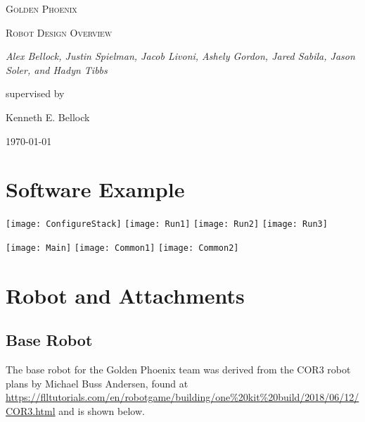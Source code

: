 \documentclass[letter, article]{article}
\begin{document}
\begin{titlepage}
	\centering
	{\scshape\LARGE Golden Phoenix \par}
	\vspace{1cm}
	{\scshape\Large Robot Design Overview\par}
	\vspace{1.5cm}
	{\huge\bfseries \par}
	\vspace{2cm}
	{\Large\itshape Alex Bellock, Justin Spielman, Jacob Livoni, Ashely Gordon, Jared Sabila, Jason Soler, and Hadyn Tibbs\par}
	\vfill
	supervised by\par
	Kenneth E. Bellock

	\vfill

	{\large \today\par}
\end{titlepage}

\section{Software Example}

\begin{center}
\texttt{[image: ConfigureStack]}
\texttt{[image: Run1]}
\texttt{[image: Run2]}
\texttt{[image: Run3]}
\end{center}

\begin{center}
\texttt{[image: Main]}
\texttt{[image: Common1]}
\texttt{[image: Common2]}
\end{center}

\section{Robot and Attachments}

\subsection{Base Robot}

The base robot for the Golden Phoenix team was derived from the COR3 robot plans by Michael Buss Andersen, found at \url{https://flltutorials.com/en/robotgame/building/one%20kit%20build/2018/06/12/COR3.html} and is shown below.
\end{document}
